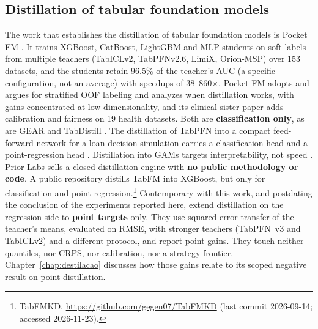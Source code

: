 \subsection{Distillation of tabular foundation models}
\label{sec:rel-destilacao}

The work that establishes the distillation of tabular foundation
models is Pocket FM \citep{pocketfm2026}. It trains XGBoost,
CatBoost, LightGBM and MLP students on soft labels from multiple
teachers (TabICLv2, TabPFNv2.6, LimiX, Orion-MSP) over 153 datasets, and the students retain 96.5\% of the teacher's AUC (a specific
configuration, not an average) with speedups of 38--860$\times$.
Pocket FM adopts and argues for stratified OOF labeling and analyzes
when distillation works, with gains concentrated at low dimensionality, and its clinical sister paper \citep{pocketfmhealth2026}
adds calibration and fairness on 19 health datasets. Both are
\textbf{classification only}, as are GEAR \citep{gear2026} and
TabDistill \citep{tabdistill2025}. The distillation of TabPFN into a
compact feed-forward network for a loan-decision simulation carries a
classification head and a point-regression head \citep{dey2026}.
Distillation into GAMs targets
interpretability, not speed \citep{tfmgam2026}. Prior Labs sells a
closed distillation engine \citep{priorlabs2025} with \textbf{no
public methodology or code}. A public repository distills TabFM into
XGBoost, but only for classification and point
regression.\footnote{TabFMKD,
\url{https://github.com/gegen07/TabFMKD} (last commit 2026-09-14;
accessed 2026-11-23).}
Contemporary with this work, and postdating the conclusion of the experiments reported here, \citet{jeong2026} extend distillation on the
regression side to \textbf{point targets} only. They use
squared-error transfer of the teacher's means, evaluated on RMSE,
with stronger teachers (TabPFN~v3 and TabICLv2) and a different
protocol, and report point gains. They touch neither quantiles,
nor CRPS, nor calibration, nor a strategy frontier.
Chapter~\ref{chap:destilacao} discusses how those gains relate to its
scoped negative result on point distillation.


